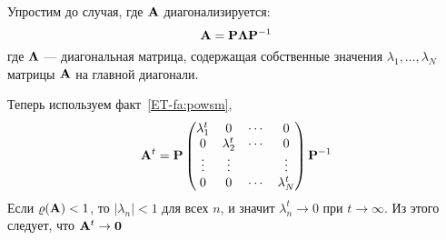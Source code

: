 \begin{frame}
    
    \vspace{2em}
    Упростим до случая, где $\mathbf A$ диагонализируется:
        $$\mathbf A = \mathbf P {\boldsymbol \Lambda} \mathbf P^{-1}$$
    где ${\boldsymbol \Lambda}$ --- диагональная матрица,
    содержащая собственные значения $\lambda_1, \ldots, \lambda_N$ матрицы $\mathbf A$
    на главной диагонали. 

    \vspace{.7em}
    Теперь используем факт~\ref{ET-fa:powsm},
    \begin{equation*}
        \mathbf A^t
        = \mathbf P
        \left(
        \begin{matrix}
            \lambda_1^t & 0 & \cdots & 0 \\
            0 & \lambda_2^t & \cdots & 0 \\
            \vdots & \vdots &  & \vdots \\
            0 & 0 & \cdots & \lambda_N^t \\
        \end{matrix}
        \right)
        \mathbf P^{-1}
    \end{equation*}
    Если $\varrho(\mathbf A) < 1$, то $|\lambda_n| < 1$ для всех $n$, и значит
    $\lambda_n^t \to 0$ при $t \to \infty$. Из этого следует, что $\mathbf A^t \to
    {\mathbf 0}$ 
    
\end{frame}




